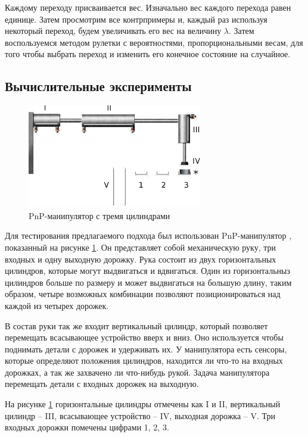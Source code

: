 \documentclass[14pt]{article}
\begin{document}
Каждому переходу присваивается вес. Изначально вес каждого перехода равен
единице. Затем просмотрим все контрпримеры и, каждый раз используя некоторый переход,
будем увеличивать его вес на величину $\lambda$. Затем воспользуемся методом
рулетки с вероятностями, пропорциональными весам, для того чтобы выбрать
переход и изменить его конечное состояние на случайное.

\subsection{Вычислительные эксперименты}

\begin{figure}[t]
    \centering
    \includegraphics[width=3in]{pic/pnp.eps}
    \caption{PnP-манипулятор с тремя цилиндрами}
    \label{pnp-system}
\end{figure}

Для тестирования предлагаемого подхода был использован PnP-манипулятор \cite{pnp},
показанный на рисунке \ref{pnp-system}.
Он представляет собой механическую руку, три входных и одну выходную дорожку.
Рука состоит из двух горизонтальных цилиндров, которые могут выдвигаться и
вдвигаться. Один из горизонтальныз цилиндров больше по размеру и может выдвигаться
на большую длину, таким образом, четыре возможных комбинации позволяют позиционироваться над
каждой из четырех дорожек.

В состав руки так же входит вертикальный цилиндр, который позволяет
перемещать всасывающее устройство вверх и вниз. Оно используется чтобы
поднимать детали с дорожек и удерживать их. У манипулятора есть сенсоры, которые определяют
положения цилиндров, находится ли что-то на входных дорожках, а так же
захвачено ли что-нибудь рукой. Задача манипулятора перемещать детали с входных
дорожек на выходную.

На рисунке \ref{pnp-system} горизонтальные цилиндры отмечены как I и II,
вертикальный цилиндр -- III, всасывающее устройство -- IV, выходная дорожка -- V.
Три входных дорожки помечены цифрами 1, 2, 3.
\end{document}
